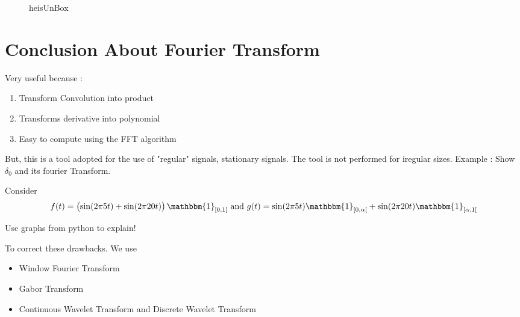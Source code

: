 \begin{figure}[ht]
    \centering
    \caption{heisUnBox}
    \label{fig:heisunbox}
\end{figure}

\section{Conclusion About Fourier Transform}
\label{sec:Conclusion About Fourier Transform}
Very useful because  : 
\begin{enumerate}
    \item Transform Convolution into product
    \item Transforms derivative into polynomial
    \item Easy to compute using the FFT algorithm
\end{enumerate}
But, this is a tool adopted for the use of "regular" signals, stationary signals. The tool
is not performed for iregular sizes. Example : 
Show $ \delta_0  $ and its fourier Transform. 

Consider 
\[
    f(t) = \left( \sin(2\pi 5t) + \sin(2\pi 20t) \right) \mathbbm{1}_{[0,1[} \text{ and } 
    g(t) = \sin(2\pi 5t) \mathbbm{1}_{[0,\alpha[} + \sin(2\pi 20t)\mathbbm{1}_{[\alpha,1[} 
\]

Use graphs from python to explain! 

To correct these drawbacks. We use 
\begin{itemize}
  \item Window Fourier Transform
  \item Gabor Transform
  \item Continuous Wavelet Transform and Discrete Wavelet Transform
\end{itemize}



